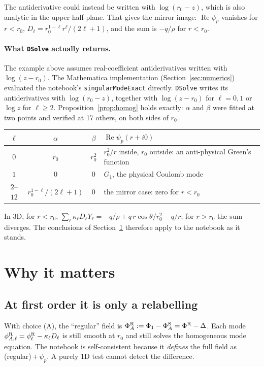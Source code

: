 \documentclass[11pt,a4paper]{article}
\renewcommand{\Re}{\operatorname{Re}}
\newcommand{\PhiS}{\Phi^{\rm S}}
\newcommand{\PhiR}{\Phi^{\rm R}}
\newcommand{\phiR}{\phi^{\rm R}}
\newcommand{\code}[1]{\texttt{#1}}
\begin{document}
The antiderivative could instead be written with $\log(r_0-z)$, which is also analytic in the upper half-plane.
That gives the mirror image: $\Re\psi_p$ vanishes for $r<r_0$, $D_\ell=r_0^{1-\ell}r^\ell/(2\ell+1)$, and the sum is $-q/\rho$ for $r<r_0$.

\paragraph{What \code{DSolve} actually returns.}
The example above assumes real-coefficient antiderivatives written with $\log(z-r_0)$.
The Mathematica implementation (Section~\ref{sec:numerics}) evaluated the notebook's \code{singularModeExact} directly.
\code{DSolve} writes its antiderivatives with $\log(r_0-z)$, together with $\log(z-r_0)$ for $\ell=0,1$ or $\log z$ for $\ell\ge2$.
Proposition~\ref{prop:homog} holds exactly: $\alpha$ and $\beta$ were fitted at two points and verified at 17 others, on both sides of $r_0$.
\begin{center}
\small
\renewcommand{\arraystretch}{1.2}
\begin{tabular}{@{}cccl@{}}
\toprule
$\ell$ & $\alpha$ & $\beta$ & $\Re\psi_p(r+i0)$\\
\midrule
$0$ & $r_0$ & $r_0^2$ & $r_0^2/r$ inside, $r_0$ outside: an anti-physical Green's function\\
$1$ & $0$ & $0$ & $G_1$, the physical Coulomb mode\\
$2$--$12$ & $r_0^{1-\ell}/(2\ell+1)$ & $0$ & the mirror case: zero for $r<r_0$\\
\bottomrule
\end{tabular}
\end{center}
In 3D, for $r<r_0$, $\sum_\ell\kappa_\ell D_\ell Y_\ell=-q/\rho+q\,r\cos\theta/r_0^2-q/r$; for $r>r_0$ the sum diverges.
The conclusions of Section~\ref{sec:matters} therefore apply to the notebook as it stands.

\section{Why it matters}\label{sec:matters}

\subsection{At first order it is only a relabelling}
With choice (A), the ``regular'' field is $\PhiR_A:=\Phi_1-\PhiS_A=\PhiR-\Delta$.
Each mode $\phiR_{A,\ell}=\phiR_\ell-\kappa_\ell D_\ell$ is still smooth at $r_0$ and still solves the homogeneous mode equation.
The notebook is self-consistent because it \emph{defines} the full field as (regular)\,$+\,\psi_p$.
A purely 1D test cannot detect the difference.
\end{document}
